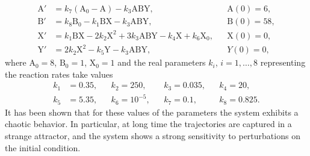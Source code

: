 \documentclass{siamart1116}
\numberwithin{theorem}{section}
\begin{document}
\begin{equation}\label{eq:PeroxOx}
\begin{aligned}
	\mathrm{A}' &= k_7  (\mathrm{A}_0 - \mathrm{A}) - k_3  \mathrm{A}\mathrm{B}\mathrm{Y}, &&\mathrm{A}(0) = 6, \\
	\mathrm{B}' &= k_8\mathrm{B}_0 - k_1  \mathrm{B}\mathrm{X} - k_3  \mathrm{A}\mathrm{B}\mathrm{Y}, &&\mathrm{B}(0) = 58, \\
	\mathrm{X}' &= k_1  \mathrm{B}\mathrm{X} - 2  k_2  \mathrm{X}^2 + 3  k_3 \mathrm{A}\mathrm{B}\mathrm{Y} - k_4  \mathrm{X} + k_6\mathrm{X}_0,&& \mathrm{X}(0) = 0, \\
	\mathrm{Y}' &= 2  k_2  \mathrm{X}^2 - k_5  \mathrm{Y} - k_3  \mathrm{A}\mathrm{B}\mathrm{Y}, && Y(0) = 0,
\end{aligned}
\end{equation}
where $\mathrm{A}_0 = 8$, $\mathrm{B}_0 = 1$, $\mathrm{X}_0 = 1$ and the real parameters $k_i$, $i = 1, \ldots, 8$ representing the reaction rates take values
\begin{equation}
\begin{aligned}
k_1 &= 0.35, &&k_2 = 250, &&k_3 = 0.035, &&k_4 = 20,\\
k_5 &= 5.35, &&k_6 = 10^{-5}, &&k_7 = 0.1, &&k_8 = 0.825.
\end{aligned}
\end{equation}            
It has been shown \cite{Ols83} that for these values of the parameters the system exhibits a chaotic behavior. In particular, at long time the trajectories are captured in a strange attractor, and the system shows a strong sensitivity to perturbations on the initial condition. 
\end{document}
